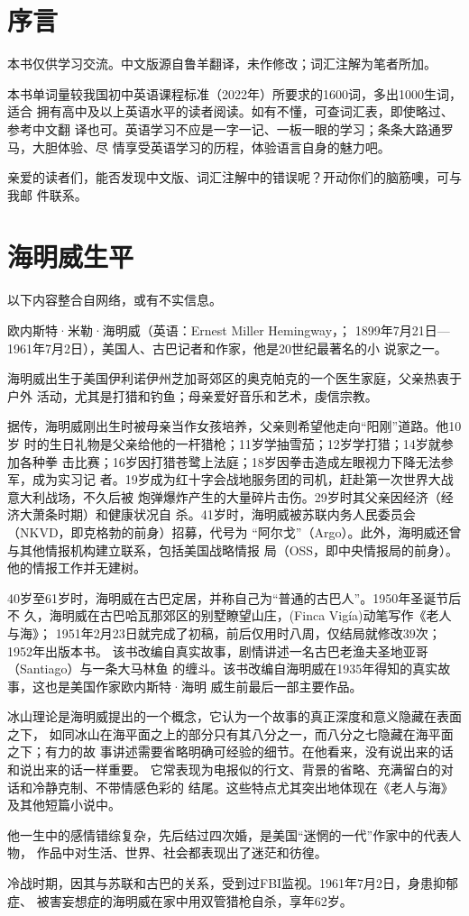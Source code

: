 \section{序言}

本书仅供学习交流。中文版源自鲁羊翻译，未作修改；词汇注解为笔者所加。

本书单词量较我国初中英语课程标准（2022年）所要求的1600词，多出1000生词，适合
拥有高中及以上英语水平的读者阅读。如有不懂，可查词汇表，即使略过、参考中文翻
译也可。英语学习不应是一字一记、一板一眼的学习；条条大路通罗马，大胆体验、尽
情享受英语学习的历程，体验语言自身的魅力吧。

亲爱的读者们，能否发现中文版、词汇注解中的错误呢？开动你们的脑筋噢，可与我邮
件联系。


\clearpage

\section{海明威生平}

以下内容整合自网络，或有不实信息。

欧内斯特·米勒·海明威（英语：Ernest Miller Hemingway，；
1899年7月21日—1961年7月2日），美国人、古巴记者和作家，他是20世纪最著名的小
说家之一。

海明威出生于美国伊利诺伊州芝加哥郊区的奥克帕克的一个医生家庭，父亲热衷于户外
活动，尤其是打猎和钓鱼；母亲爱好音乐和艺术，虔信宗教。

据传，海明威刚出生时被母亲当作女孩培养，父亲则希望他走向“阳刚”道路。他10岁
时的生日礼物是父亲给他的一杆猎枪；11岁学抽雪茄；12岁学打猎；14岁就参加各种拳
击比赛；16岁因打猎苍鹭上法庭；18岁因拳击造成左眼视力下降无法参军，成为实习记
者。19岁成为红十字会战地服务团的司机，赶赴第一次世界大战意大利战场，不久后被
炮弹爆炸产生的大量碎片击伤。29岁时其父亲因经济（经济大萧条时期）和健康状况自
杀。41岁时，海明威被苏联内务人民委员会（NKVD，即克格勃的前身）招募，代号为
“阿尔戈”（Argo）。此外，海明威还曾与其他情报机构建立联系，包括美国战略情报
局（OSS，即中央情报局的前身）。他的情报工作并无建树。

40岁至61岁时，海明威在古巴定居，并称自己为“普通的古巴人”。1950年圣诞节后不
久，海明威在古巴哈瓦那郊区的别墅瞭望山庄，(Finca Vigía)动笔写作《老人与海》；
1951年2月23日就完成了初稿，前后仅用时八周，仅结局就修改39次；1952年出版本书。
该书改编自真实故事，剧情讲述一名古巴老渔夫圣地亚哥（Santiago）与一条大马林鱼
的缠斗。该书改编自海明威在1935年得知的真实故事，这也是美国作家欧内斯特·海明
威生前最后一部主要作品。

冰山理论是海明威提出的一个概念，它认为一个故事的真正深度和意义隐藏在表面之下，
如同冰山在海平面之上的部分只有其八分之一，而八分之七隐藏在海平面之下；有力的故
事讲述需要省略明确可经验的细节。在他看来，没有说出来的话和说出来的话一样重要。
它常表现为电报似的行文、背景的省略、充满留白的对话和冷静克制、不带情感色彩的
结尾。这些特点尤其突出地体现在《老人与海》及其他短篇小说中。

他一生中的感情错综复杂，先后结过四次婚，是美国“迷惘的一代”作家中的代表人物，
作品中对生活、世界、社会都表现出了迷茫和彷徨。

冷战时期，因其与苏联和古巴的关系，受到过FBI监视。1961年7月2日，身患抑郁症、
被害妄想症的海明威在家中用双管猎枪自杀，享年62岁。
